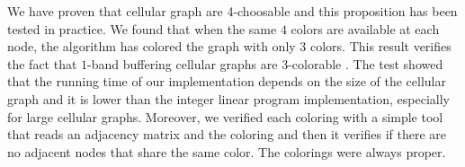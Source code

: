 \documentclass[letterpaper, 10 pt, conference]{ieeeconf}  %
\begin{document}
We have proven that cellular graph are 4-choosable and this proposition has been tested in practice. We found that when the same $4$ colors are available at each node, the algorithm has colored the graph with only $3$ colors. This result verifies the fact that $1$-band buffering cellular graphs are $3$-colorable \cite{662943}.
The test showed that the running time of our implementation depends on the size of the cellular graph and it is lower than the integer linear program implementation, especially for large cellular graphs. Moreover, we verified each coloring with a simple tool that reads an adjacency matrix and the coloring and then it verifies if there are no adjacent nodes that share the same color. The colorings were always proper.


\addtolength{\textheight}{-12cm}   %




\end{document}
